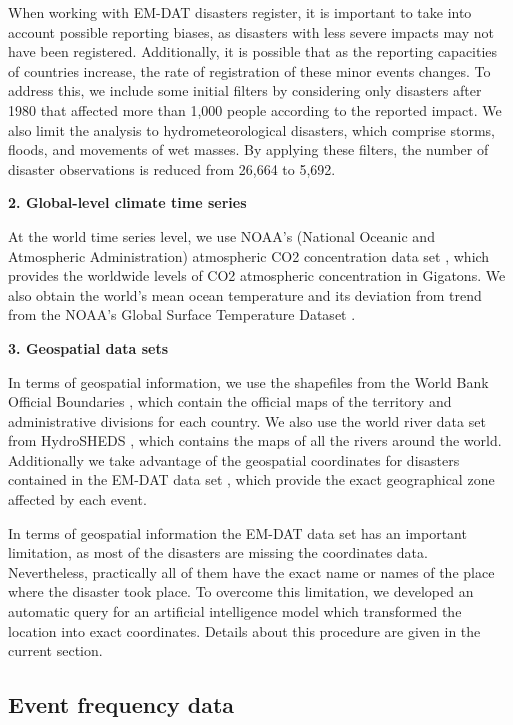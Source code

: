 When working with EM-DAT disasters register, it is important to take into account possible reporting biases, as disasters with less severe impacts may not have been registered. Additionally, it is possible that as the reporting capacities of countries increase, the rate of registration of these minor events changes. To address this, we include some initial filters by considering only disasters after 1980 that affected more than 1,000 people according to the reported impact. We also limit the analysis to hydrometeorological disasters, which comprise storms, floods, and movements of wet masses. By applying these filters, the number of disaster observations is reduced from 26,664 to 5,692.

\textbf{2. Global-level climate time series}

At the world time series level, we use NOAA's (National Oceanic and Atmospheric Administration) atmospheric CO2 concentration data set \citep{noaa_co2_2024}, which provides the worldwide levels of CO2 atmospheric concentration in Gigatons. We also obtain the world's mean ocean temperature and its deviation from trend from the NOAA's Global Surface Temperature Dataset \citep{zhang_noaa_2019}.

\textbf{3. Geospatial data sets}

In terms of geospatial information, we use the shapefiles from the World Bank Official Boundaries \citep{worldbank_boundaries_2024}, which contain the official maps of the territory and administrative divisions for each country. We also use the world river data set from HydroSHEDS \citep{lehner_global_2013}, which contains the maps of all the rivers around the world.  Additionally we take advantage of the geospatial coordinates for disasters contained in the EM-DAT data set \citep{cred_emdat_2024}, which provide the exact geographical zone affected by each event.

In terms of geospatial information the EM-DAT data set has an important limitation, as most of the disasters are missing the coordinates data. Nevertheless, practically all of them have the exact name or names of the place where the disaster took place. To overcome this limitation, we developed an automatic query for an artificial intelligence model which transformed the location into exact coordinates. Details about this procedure are given in the current section.



\subsection{Event frequency data}

